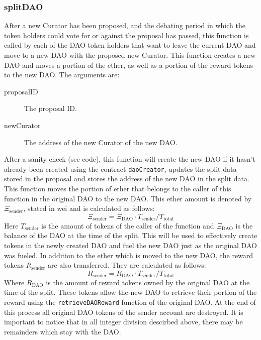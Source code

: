 \documentclass[9pt,oneside]{amsart}
\begin{document}
\begin{multicols}{2}
\subsubsection*{splitDAO}
After a new Curator has been proposed, and the debating period in which the token holders could vote for or against the proposal has passed, this function is called by each of the DAO token holders that want to leave the current DAO and move to a new DAO with the proposed new Curator. This function creates a new DAO and moves a portion of the ether, as well as a portion of the reward tokens to the new DAO.
The arguments are:
\begin{description}
 \item[proposalID] The proposal ID.
 \item[newCurator] The address of the new Curator of the new DAO.
\end{description}
After a sanity check (see code), this function will create the new DAO if it hasn’t already been created using the contract \verb|daoCreator|, updates the split data stored in the proposal and stores the address of the new DAO in the split data.
This function moves the portion of ether that belongs to the caller of this function in the original DAO to the new DAO. This ether amount is denoted by $\Xi_{\text{sender}}$, stated in wei and is calculated as follows:
\begin{equation}
 \Xi_{\text{sender}} = \Xi_{\text{DAO}} \cdot T_{\text{sender}} / T_{\text{total}}
\end{equation}
Here $T_{\text{sender}}$ is the amount of tokens of the caller of the function and $\Xi_{\text{DAO}}$ is the balance of the DAO at the time of the split.
This will be used to effectively create tokens in the newly created DAO and fuel the new DAO just as the original DAO was fueled.
In addition to the ether which is moved to the new DAO, the reward tokens $R_{\text{sender}}$ are also transferred. 
They are calculated as follows:
\begin{equation}
 R_{\text{sender}} = R_{\text{DAO}} \cdot T_{\text{sender}} / T_{\text{total}}
\end{equation}
Where $R_{\text{DAO}}$ is the amount of reward tokens owned by the original DAO at the time of the split. These tokens allow the new DAO to retrieve their portion of the reward using the \verb|retrieveDAOReward| function of the original DAO.
At the end of this process all original DAO tokens of the sender account are destroyed. It is important to notice that in all integer division descirbed above, there may be remainders which stay with the DAO.


\end{multicols}
\end{document}
